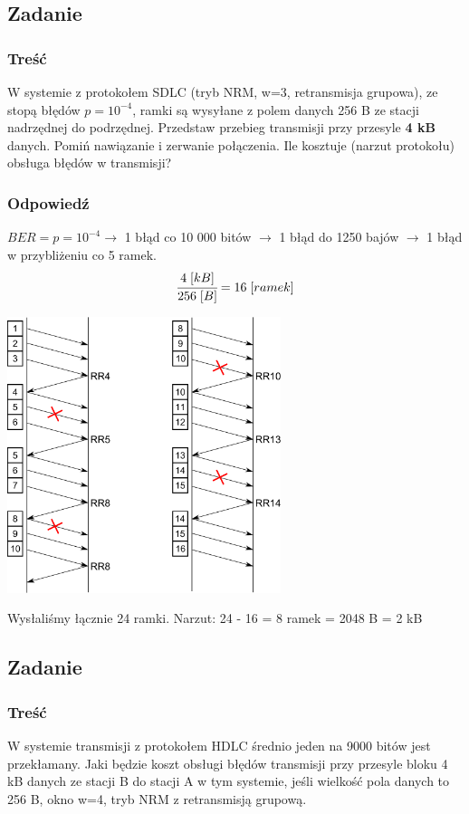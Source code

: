 \documentclass[a4paper,twoside]{article}
\begin{document}
\newpage
\subsection{Zadanie}
\subsubsection{Treść}
W systemie z protokołem SDLC (tryb NRM, w=3, retransmisja grupowa), ze stopą błędów $ p=10^{-4} $, ramki są wysyłane z polem danych 256 B ze stacji nadrzędnej do podrzędnej. Przedstaw przebieg transmisji przy przesyle \textbf{4 kB} danych. Pomiń nawiązanie i zerwanie połączenia. Ile kosztuje (narzut protokołu) obsługa błędów w transmisji?
\subsubsection{Odpowiedź}
$ BER=p=10^{-4} \rightarrow$ 1 błąd co 10 000 bitów $ \rightarrow $ 1 błąd do 1250 bajów $ \rightarrow $ 1 błąd w przybliżeniu co 5 ramek.\\
$$ \cfrac{4\;[kB]}{256\;[B]}=16\;[ramek] $$
\begin{center}
	\includegraphics[width=8.0cm]{./images/zadanie10.pdf}
\end{center}
Wysłaliśmy łącznie 24 ramki. Narzut: 24 - 16 = 8 ramek = 2048 B = 2 kB
\newpage
\subsection{Zadanie}
\subsubsection{Treść}
W systemie transmisji z protokołem HDLC średnio jeden na 9000 bitów jest przekłamany. Jaki będzie koszt obsługi błędów transmisji przy przesyle bloku 4 kB danych ze stacji B do stacji A w tym systemie, jeśli wielkość pola danych to 256 B, okno w=4, tryb NRM z retransmisją grupową.
\end{document}
